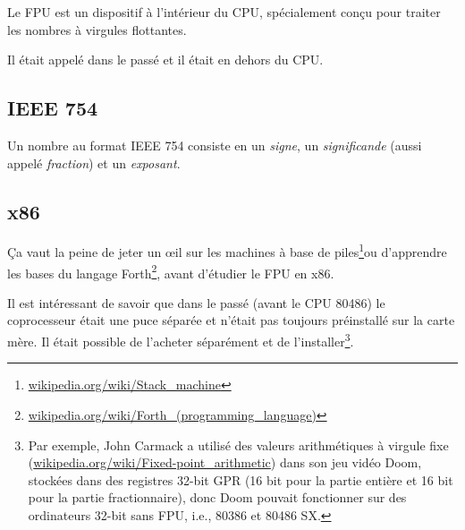 ﻿\mysection{\FPUChapterName}
\label{sec:FPU}

\newcommand{\FNURLSTACK}{\footnote{\href{http://go.yurichev.com/17123}{wikipedia.org/wiki/Stack\_machine}}}
\newcommand{\FNURLFORTH}{\footnote{\href{http://go.yurichev.com/17124}{wikipedia.org/wiki/Forth\_(programming\_language)}}}
\newcommand{\FNURLIEEE}{\footnote{\href{http://go.yurichev.com/17125}{wikipedia.org/wiki/IEEE\_floating\_point}}}
\newcommand{\FNURLSP}{\footnote{\href{http://go.yurichev.com/17126}{wikipedia.org/wiki/Single-precision\_floating-point\_format}}}
\newcommand{\FNURLDP}{\footnote{\href{http://go.yurichev.com/17127}{wikipedia.org/wiki/Double-precision\_floating-point\_format}}}
\newcommand{\FNURLEP}{\footnote{\href{http://go.yurichev.com/17128}{wikipedia.org/wiki/Extended\_precision}}}

Le \ac{FPU} est un dispositif à l'intérieur du \ac{CPU}, spécialement conçu pour
traiter les nombres à virgules flottantes.

Il était appelé  dans le passé et il était en dehors du \ac{CPU}.

\subsection{IEEE 754}

Un nombre au format IEEE 754 consiste en un \emph{signe}, un \emph{significande} (aussi
appelé \emph{fraction}) et un \emph{exposant}.

\subsection{x86}

Ça vaut la peine de jeter un \oe{}il sur les machines à base de piles\FNURLSTACK ou
d'apprendre les bases du langage Forth\FNURLFORTH, avant d'étudier le \ac{FPU} en
x86.

Il est intéressant de savoir que dans le passé (avant le CPU 80486) le coprocesseur
était une puce séparée et n'était pas toujours préinstallé sur la carte mère. Il
était possible de l'acheter séparément et de l'installer\footnote{Par exemple, John
Carmack a utilisé des valeurs arithmétiques à virgule fixe
(\href{http://go.yurichev.com/17356}{wikipedia.org/wiki/Fixed-point\_arithmetic})
dans son jeu vidéo Doom, stockées dans des registres 32-bit \ac{GPR} (16 bit pour
la partie entière et 16 bit pour la partie fractionnaire), donc Doom pouvait fonctionner
sur des ordinateurs 32-bit sans FPU, i.e., 80386 et 80486 SX.}.

